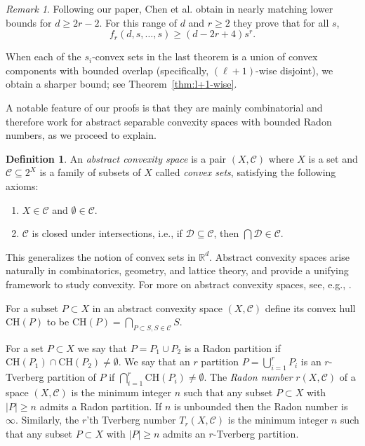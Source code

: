\documentclass[11pt]{article}
\def\Re{\mathbb R}
\theoremstyle{plain}
\theoremstyle{definition}
\newtheorem{definition}[theorem]{Definition}
\theoremstyle{remark}
\newtheorem{remark}[theorem]{Remark}
\newcommand{\calC}{\mathcal{C}}
\newcommand{\D}{\mathcal{D}}
\newcommand{\cardin}[1]{\lvert {#1} \rvert}
\def\marrow{{\marginpar[\hfill$\longrightarrow$]{$\longleftarrow$}}}
\def\shakhar#1{{\sc Shakhar says: }{\marrow\sf #1}}
\begin{document}
\begin{remark}
	Following our paper,
Chen et al. obtain in \cite{ChenETAL2025} nearly matching lower bounds
for $d \geq 2r-2$. For this range of $d$ and $r \geq 2$ they prove
that for all $s$,
	$$f_r(d,s,\ldots,s) \geq (d-2r+4) s^r.$$
\end{remark}
When each of the $s_i$-convex sets in the last theorem is a union of convex components with bounded overlap (specifically, $(\ell+1)$-wise disjoint), we obtain a sharper bound; see Theorem~\ref{thm:l+1-wise}.

A notable feature of our proofs is that they are mainly 
combinatorial and therefore work for abstract
separable convexity spaces with bounded Radon numbers, as we proceed to explain.

\begin{definition}    
An \emph{abstract convexity space} is a pair $(X, \mathcal{C})$ where $X$ is a set and $\mathcal{C} \subseteq 2^X$ is a family of subsets of $X$ called \emph{convex sets}, satisfying the following axioms:
\begin{enumerate}
  \item $X \in \mathcal{C}$ and $\emptyset \in \mathcal{C}$.
  \item $\mathcal{C}$ is closed under intersections, i.e., if $\D \subseteq \mathcal{C}$, then $\bigcap \D  \in \mathcal{C}$.

\end{enumerate}
\end{definition}

This generalizes the notion of convex sets in $\Re^d$. Abstract convexity spaces arise naturally in combinatorics, geometry, and lattice theory, and provide a unifying framework to study convexity. For more on abstract convexity spaces, see, e.g., \cite{Holmsen2025,MoranYehud20,vandevel1993}. 


For a subset $P \subset X$ in an abstract convexity space $(X,\calC)$ define its convex hull $\text{CH}(P)$ to be $\text{CH}(P) = \bigcap_{P \subset S, S \in \calC} S$.

For a set $P \subset X$ we say that $P = P_1 \cup P_2$ is a Radon partition if $\text{CH}(P_1) \cap \text{CH}(P_2)\neq \emptyset$.
We say that an $r$ partition $P=\bigcup_{i=1}^r P_i$ is an $r$-Tverberg partition of $P$ if $\bigcap_{i=1}^r \text{CH}(P_i) \neq \emptyset$.
The {\em Radon number} $r(X, \calC)$ of a space $(X,\calC)$ is the minimum integer $n$ such that any subset $P \subset X$ with $\cardin{P}\geq n$ admits a Radon partition. If $n$ is unbounded then the Radon number is $\infty$. Similarly, the $r$'th Tverberg number $T_r(X,\calC)$ is the minimum integer $n$ such that any subset $P \subset X$ with $\cardin{P}\geq n$ admits an $r$-Tverberg partition. 
\end{document}
